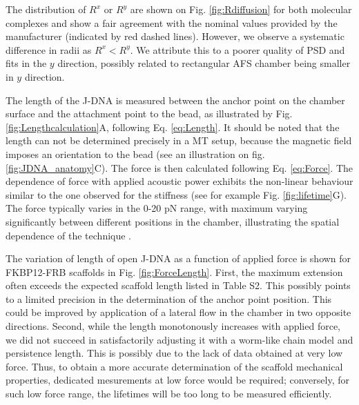 \documentclass{biophys-new}
\begin{document}
The distribution of $R^x$ or $R^y$ are shown on Fig. \ref{fig:Rdiffusion} for both molecular complexes and show a fair agreement with the nominal values provided by the manufacturer (indicated by red dashed lines). However, we observe a systematic difference in radii as $R^x < R^y$. We attribute this to a poorer quality of PSD and fits in the $y$ direction, possibly related to rectangular AFS chamber being smaller in $y$ direction.

The length of the J-DNA is measured between the anchor point on the chamber surface and the attachment point to the bead, as illustrated by Fig. \ref{fig:Lengthcalculation}A, following Eq. \ref{eq:Length}. It should be noted that the length can not be determined precisely in a MT setup, because the magnetic field imposes an orientation to the bead (see an illustration on fig. \ref{fig:JDNA_anatomy}C). The force is then calculated following Eq. \ref{eq:Force}. The dependence of force with applied acoustic power exhibits the non-linear behaviour similar to the one observed for the stiffness (see for example Fig. \ref{fig:lifetime}G). The force typically varies in the 0-20 pN range, with maximum varying significantly between different positions in the chamber, illustrating the spatial dependence of the technique \cite{nguyen2021}.


The variation of length of open J-DNA as a function of applied force is shown for FKBP12-FRB scaffolds in Fig. \ref{fig:ForceLength}. First, the maximum extension often exceeds the expected scaffold length listed in Table S2. This possibly points to a limited precision in the determination of the anchor point position. This could be improved by application of a lateral flow in the chamber in two opposite directions. Second, while the length monotonously increases with applied force, we did not succeed in satisfactorily adjusting it with a worm-like chain model and persistence length. This is possibly due to the lack of data obtained at very low force. Thus, to obtain a more accurate determination of the scaffold mechanical properties, dedicated mesurements at low force would be required; conversely, for such low force range, the lifetimes will be too long to be measured efficiently.

\end{document}
